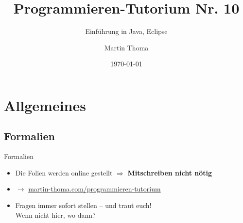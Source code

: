 \documentclass[usepdftitle=false,hyperref={pdfpagelabels=false}]{beamer}
\institute{Fakultät für Informatik}
\newcommand\tutor{Martin Thoma}
\newcommand\tutNR{10}
\newcommand\titleText{Programmieren-Tutorium Nr. \tutNR{}}
\newcommand\InsertToC[1][]{
  \begin{frame}{Outline}
    \tableofcontents[subsectionstyle=show/show/show, subsubsectionstyle=show/show/show, #1]
  \end{frame}
}
\begin{document}
\title{\titleText}
\subtitle{Einführung in Java, Eclipse}
\author{\tutor}
\date{\today}
\subject{Programmieren}

\frame{\titlepage}



\section{Allgemeines}
\subsection{Formalien}
\begin{frame}{Formalien}
    \begin{itemize}
        \item Die Folien werden online gestellt $ \Rightarrow $
              \textbf{Mitschreiben nicht nötig}
        \item $\rightarrow$ \href{http://martin-thoma.com/programmieren-tutorium}{martin-thoma.com/programmieren-tutorium}
        \item Fragen immer sofort stellen – und traut euch!\\
              Wenn nicht hier, wo dann?
    \end{itemize}
\end{frame}
\end{document}
